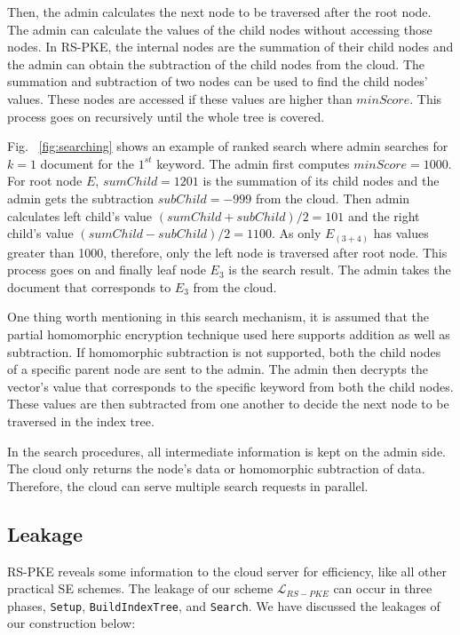\documentclass[sigconf,pdftex]{acmart}
\begin{document}
Then, the admin calculates the next node to be traversed after the root node. The admin can calculate the values of the child nodes without accessing those nodes. In RS-PKE, the internal nodes are the summation of their child nodes and the admin can obtain the subtraction of the child nodes from the cloud. The summation and subtraction of two nodes can be used to find the child nodes' values. These nodes are accessed if these values are higher than $minScore$. This process goes on recursively until the whole tree is covered.

Fig. ~\ref{fig:searching} shows an example of ranked search where admin searches for $k=1$ document for the $1^{st}$ keyword. The admin first computes $minScore = 1000$. For root node $E$, $sumChild = 1201$ is the summation of its child nodes and the admin gets the subtraction $subChild = -999$ from the cloud. Then admin calculates left child's value $(sumChild+subChild)/2=101$ and the right child's value $(sumChild-subChild)/2=1100$. As only $E_{(3+4)}$ has values greater than 1000, therefore, only the left node is traversed after root node. This process goes on and finally leaf node $E_{3}$ is the search result. The admin takes the document that corresponds to $E_{3}$ from the cloud.


One thing worth mentioning in this search mechanism, it is assumed that the partial homomorphic encryption technique used here supports addition as well as subtraction. If homomorphic subtraction is not supported, both the child nodes of a specific parent node are sent to the admin. The admin then decrypts the vector's value that corresponds to the specific keyword from both the child nodes. These values are then subtracted from one another to decide the next node to be traversed in the index tree.

In the search procedures, all intermediate information is kept on the admin side. The cloud only returns the node's data or homomorphic subtraction of data. Therefore, the cloud can serve multiple search requests in parallel. 



\subsection{Leakage}\label{leakage}

RS-PKE reveals some information to the cloud server for efficiency, like all other practical SE schemes. The leakage of our scheme $\mathcal{L}_{RS-PKE}$ can occur in three phases, \texttt{Setup}, \texttt{BuildIndexTree}, and \texttt{Search}. We have discussed the leakages of our construction below:
\end{document}
